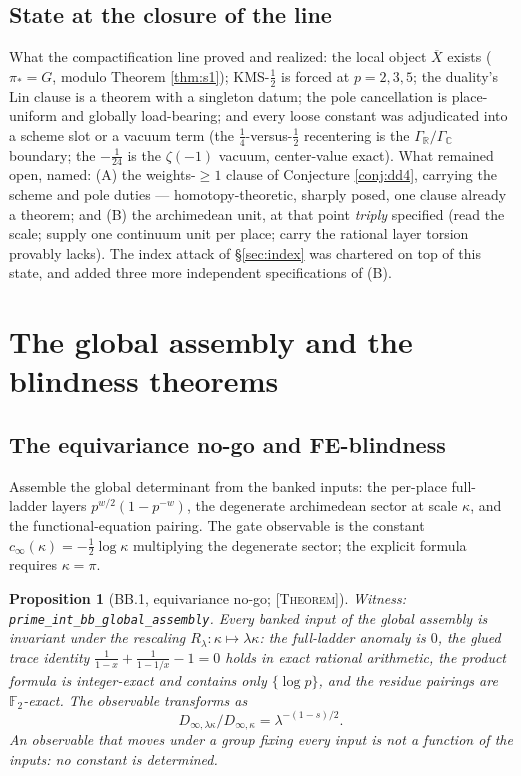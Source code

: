 \documentclass[11pt,reqno]{amsart}
\theoremstyle{plain}
\newtheorem{proposition}[theorem]{Proposition}
\theoremstyle{definition}
\theoremstyle{remark}
\newcommand{\R}{\mathbb{R}}
\newcommand{\C}{\mathbb{C}}
\newcommand{\F}{\mathbb{F}}
\newcommand{\Xbar}{\overline{X}}
\newcommand{\grade}[1]{\textup{[\textsc{#1}]}}
\begin{document}
\subsection{State at the closure of the line}

What the compactification line proved and realized: the local object $\Xbar$ exists
($\pi_* = G$, modulo Theorem \ref{thm:s1}); KMS-$\tfrac12$ is forced at $p = 2, 3, 5$; the
duality's Lin clause is a theorem with a singleton datum; the pole cancellation is
place-uniform and globally load-bearing; and every loose constant was adjudicated into a
scheme slot or a vacuum term (the $\tfrac14$-versus-$\tfrac12$ recentering is the
$\Gamma_\R/\Gamma_\C$ boundary; the $-\tfrac1{24}$ is the $\zeta(-1)$ vacuum,
center-value exact). What remained open, named: (A) the weights-$\ge 1$ clause of
Conjecture \ref{conj:dd4}, carrying the scheme and pole duties --- homotopy-theoretic,
sharply posed, one clause already a theorem; and (B) the archimedean unit, at that point
\emph{triply} specified (read the scale; supply one continuum unit per place; carry the
rational layer torsion provably lacks). The index attack of \S\ref{sec:index} was chartered
on top of this state, and added three more independent specifications of (B).

\section{The global assembly and the blindness theorems}\label{sec:global}

\subsection{The equivariance no-go and FE-blindness}

Assemble the global determinant from the banked inputs: the per-place full-ladder layers
$p^{w/2}(1 - p^{-w})$, the degenerate archimedean sector at scale $\kappa$, and the
functional-equation pairing. The gate observable is the constant
$c_\infty(\kappa) = -\tfrac12\log\kappa$ multiplying the degenerate sector; the explicit
formula requires $\kappa = \pi$.

\begin{proposition}[BB.1, equivariance no-go; \grade{Theorem}]\label{prop:bb1}
Witness: \texttt{prime\_\allowbreak int\_\allowbreak bb\_\allowbreak global\_\allowbreak assembly}.
Every banked input of the global assembly is invariant under the rescaling
$R_\lambda : \kappa \mapsto \lambda\kappa$: the full-ladder anomaly is $0$, the glued trace
identity $\frac{1}{1-x} + \frac{1}{1-1/x} - 1 = 0$ holds in exact rational arithmetic, the
product formula is integer-exact and contains only $\{\log p\}$, and the residue pairings are
$\F_2$-exact. The observable transforms as
\[ D_{\infty,\lambda\kappa}/D_{\infty,\kappa} = \lambda^{-(1-s)/2}. \]
An observable that moves
under a group fixing every input is not a function of the inputs: \emph{no constant is
determined}.
\end{proposition}
\end{document}
